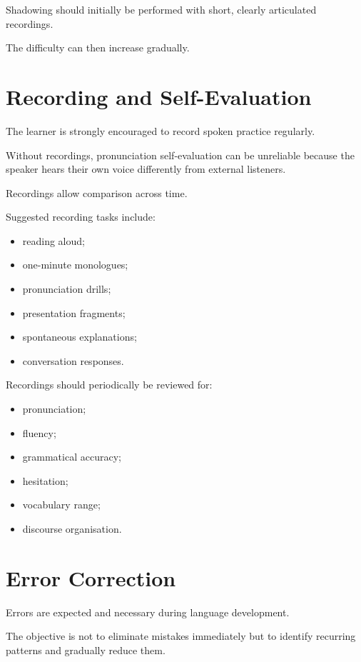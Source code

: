 Shadowing should initially be performed with short, clearly articulated recordings.

The difficulty can then increase gradually.

\section*{Recording and Self-Evaluation}

The learner is strongly encouraged to record spoken practice regularly.

Without recordings, pronunciation self-evaluation can be unreliable because the speaker hears their own voice differently from external listeners.

Recordings allow comparison across time.

Suggested recording tasks include:

\begin{itemize}
    \item reading aloud;
    \item one-minute monologues;
    \item pronunciation drills;
    \item presentation fragments;
    \item spontaneous explanations;
    \item conversation responses.
\end{itemize}

Recordings should periodically be reviewed for:

\begin{itemize}
    \item pronunciation;
    \item fluency;
    \item grammatical accuracy;
    \item hesitation;
    \item vocabulary range;
    \item discourse organisation.
\end{itemize}

\section*{Error Correction}

Errors are expected and necessary during language development.

The objective is not to eliminate mistakes immediately but to identify recurring patterns and gradually reduce them.

